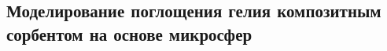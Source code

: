 %
%
%
%
%
%
%
%
%
%







\subsection{Моделирование поглощения гелия композитным сорбентом на основе микросфер}


